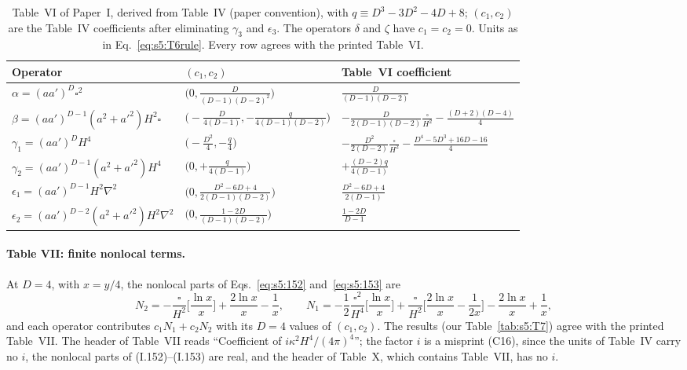 \documentclass[aps,prd,onecolumn,10pt,nofootinbib,floatfix]{revtex4-2}
\newcommand{\PI}{Paper~I}
\newcommand{\eqI}[1]{(I.#1)}
\begin{document}
\begin{table}[tb]
\caption{Table~VI of \PI, derived from Table~IV (paper convention), with $q\equiv D^3-3D^2-4D+8$; $(c_1,c_2)$ are the Table~IV coefficients after eliminating $\gamma_3$ and $\epsilon_3$. The operators $\delta$ and $\zeta$ have $c_1=c_2=0$. Units as in Eq.~\eqref{eq:s5:T6rule}. Every row agrees with the printed Table~VI.}
\label{tab:s5:T6}
\renewcommand{\arraystretch}{1.5}
\begin{ruledtabular}
\begin{tabular}{lll}
Operator & $(c_1,c_2)$ & Table~VI coefficient\\
\hline
$\alpha=(aa')^D\square^2$ & $\big(0,\frac{D}{(D-1)(D-2)^2}\big)$ & $\frac{D}{(D-1)(D-2)}$\\
$\beta=(aa')^{D-1}(a^2+a'^2)H^2\square$ & $\big(-\frac{D}{4(D-1)},-\frac{q}{4(D-1)(D-2)}\big)$ & $-\frac{D}{2(D-1)(D-2)}\frac{\square}{H^2}-\frac{(D+2)(D-4)}{4}$\\
$\gamma_1=(aa')^DH^4$ & $\big(-\frac{D^2}{4},-\frac q4\big)$ & $-\frac{D^2}{2(D-2)}\frac{\square}{H^2}-\frac{D^4-5D^3+16D-16}{4}$\\
$\gamma_2=(aa')^{D-1}(a^2+a'^2)H^4$ & $\big(0,+\frac{q}{4(D-1)}\big)$ & $+\frac{(D-2)q}{4(D-1)}$\\
$\epsilon_1=(aa')^{D-1}H^2\nabla^2$ & $\big(0,\frac{D^2-6D+4}{2(D-1)(D-2)}\big)$ & $\frac{D^2-6D+4}{2(D-1)}$\\
$\epsilon_2=(aa')^{D-2}(a^2+a'^2)H^2\nabla^2$ & $\big(0,\frac{1-2D}{(D-1)(D-2)}\big)$ & $\frac{1-2D}{D-1}$\\
\end{tabular}
\end{ruledtabular}
\end{table}

\paragraph*{Table VII: finite nonlocal terms.}
At $D=4$, with $x=y/4$, the nonlocal parts of Eqs.~\eqref{eq:s5:152} and~\eqref{eq:s5:153} are
\begin{equation}
N_{2}=-\frac{\square}{H^2}\Big[\frac{\ln x}{x}\Big]+\frac{2\ln x}{x}-\frac1x,\qquad
N_{1}=-\frac12\frac{\square^2}{H^4}\Big[\frac{\ln x}{x}\Big]+\frac{\square}{H^2}\Big[\frac{2\ln x}{x}-\frac1{2x}\Big]-\frac{2\ln x}{x}+\frac1x ,
\label{eq:s5:N}
\end{equation}
and each operator contributes $c_1N_1+c_2N_2$ with its $D=4$ values of $(c_1,c_2)$.
The results (our Table~\ref{tab:s5:T7}) agree with the printed Table~VII.
The header of Table~VII reads ``Coefficient of $i\kappa^2H^4/(4\pi)^4$''; the factor $i$ is a misprint (C16), since the units of Table~IV carry no $i$, the nonlocal parts of \eqI{152}--\eqI{153} are real, and the header of Table~X, which contains Table~VII, has no $i$.
\end{document}
